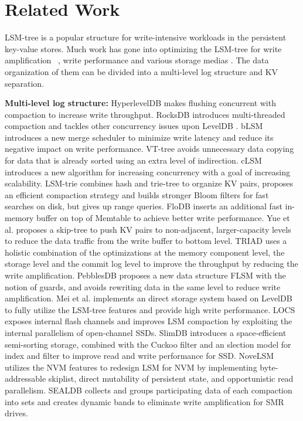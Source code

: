 \documentclass[sigconf]{acmart}
\begin{document}
\section{Related Work}
LSM-tree \cite{LSMtree} is a popular structure for write-intensive workloads in the persistent key-value stores. Much work has gone into optimizing the LSM-tree for write amplification ~\cite{VTtree,TRIAD,PebblesDB}, write performance \cite{RocksDB,FloDB,cLSM} and various storage medias \cite{LOCS,SlimDB,NoveLSM}. The data organization of them can be divided into a multi-level log structure and KV separation.

\textbf{Multi-level log structure:} HyperlevelDB \cite{HyperLevelDB} makes flushing concurrent with compaction to increase write throughput. RocksDB \cite{RocksDB} introduces multi-threaded compaction and tackles other concurrency issues upon LevelDB \cite{LevelDB}. bLSM \cite{bLSM} introduces a new merge scheduler to minimize write latency and reduce its negative impact on write performance. VT-tree \cite{VTtree} avoids unnecessary data copying for data that is already sorted using an extra level of indirection. cLSM \cite{cLSM} introduces a new algorithm for increasing concurrency with a goal of increasing scalability. LSM-trie \cite{LSMtrie} combines hash and trie-tree to organize KV pairs, proposes an efficient compaction strategy and builds stronger Bloom filters for fast searches on disk, but gives up range queries. FloDB \cite{FloDB} inserts an additional fast in-memory buffer on top of Memtable to achieve better write performance. Yue et al. \cite{skiptree} proposes a skip-tree to push KV pairs to non-adjacent, larger-capacity levels to reduce the data traffic from the write buffer to bottom level. TRIAD \cite{TRIAD} uses a holistic combination of the optimizations at the memory component level, the storage level and the commit log level to improve the throughput by reducing the write amplification. PebblesDB \cite{PebblesDB} proposes a new data structure FLSM with the notion of guards, and avoids rewriting data in the same level to reduce write amplification. Mei et al. \cite{LDS} implements an direct storage system based on LevelDB to fully utilize the LSM-tree features and provide high write performance. LOCS\cite{LOCS} exposes internal flash channels and improves LSM compaction by exploiting the internal parallelism of open-channel SSDs. SlimDB \cite{SlimDB} introduces a space-efficient semi-sorting storage, combined with the Cuckoo filter and an slection model for index and filter to improve read and write performance for SSD. NoveLSM \cite{NoveLSM} utilizes the NVM features to redesign LSM for NVM by implementing byte-addressable skiplist, direct mutability of persistent state, and opportunistic read parallelism. SEALDB \cite{SEALDB} collects and groups participating data of each compaction into sets and creates dynamic bands to eliminate write amplification for SMR drives.
\end{document}
